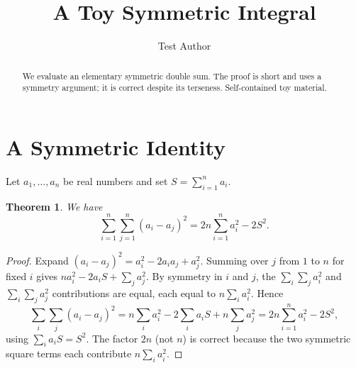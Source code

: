 \documentclass{article}
\newtheorem{theorem}{Theorem}
\begin{document}
\title{A Toy Symmetric Integral}
\author{Test Author}
\maketitle

\begin{abstract}
We evaluate an elementary symmetric double sum. The proof is short and uses a
symmetry argument; it is correct despite its terseness. Self-contained toy
material.
\end{abstract}

\section{A Symmetric Identity}
Let $a_1, \dots, a_n$ be real numbers and set $S = \sum_{i=1}^n a_i$.

\begin{theorem}
\label{thm:symmetric}
We have
\[
  \sum_{i=1}^n \sum_{j=1}^n (a_i - a_j)^2 = 2 n \sum_{i=1}^n a_i^2 - 2 S^2 .
\]
\end{theorem}

\begin{proof}
Expand $(a_i - a_j)^2 = a_i^2 - 2 a_i a_j + a_j^2$. Summing over $j$ from $1$ to
$n$ for fixed $i$ gives $n a_i^2 - 2 a_i S + \sum_{j} a_j^2$. By symmetry in $i$
and $j$, the $\sum_i \sum_j a_i^2$ and $\sum_i \sum_j a_j^2$ contributions are
equal, each equal to $n \sum_i a_i^2$. Hence
\[
  \sum_{i}\sum_{j} (a_i - a_j)^2
    = n \sum_i a_i^2 - 2 \sum_i a_i S + n \sum_j a_j^2
    = 2 n \sum_{i=1}^n a_i^2 - 2 S^2,
\]
using $\sum_i a_i S = S^2$. The factor $2n$ (not $n$) is correct because the two
symmetric square terms each contribute $n \sum_i a_i^2$.
\end{proof}
\end{document}
